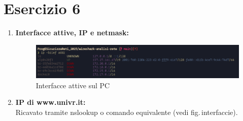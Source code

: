\documentclass[a4paper,12pt]{article}
\begin{document}
\section*{Esercizio 6}
\begin{enumerate}
  \item \textbf{Interfacce attive, IP e netmask:}\\
    \begin{figure}[h]
      \centering
      \includegraphics[width=0.6\linewidth]{src/interfaccie.png}
      \caption{Interfacce attive sul PC}
    \end{figure}
  \item \textbf{IP di www.univr.it:}\\
    Ricavato tramite nslookup o comando equivalente (vedi fig.\,interfaccie).
\end{enumerate}
\end{document}
